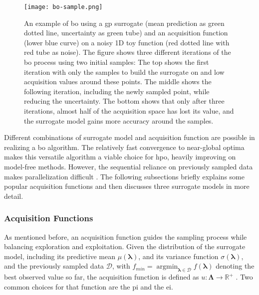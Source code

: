\begin{figure}[h]
	\centering
	\texttt{[image: bo-sample.png]}
	\caption[An example of \gls{bo} using a \gls{gp} surrogate]{An example of \gls{bo} using a \gls{gp} surrogate (mean prediction as green dotted line, uncertainty as green tube) and an acquisition function (lower blue curve) on a noisy 1D toy function (red dotted line with red tube as noise).
		The figure shows three different iterations of the \gls{bo} process using two initial samples: The top shows the first iteration with only the samples to build the surrogate on and low acquisition values around these points. The middle shows the following iteration, including the newly sampled point, while reducing the uncertainty. The bottom shows that only after three iterations, almost half of the acquisition space has lost its value, and the surrogate model gains more accuracy around the samples.}
	\label{fig:bo-sample}
\end{figure}

Different combinations of surrogate model and acquisition function are possible in realizing a \gls{bo} algorithm. The relatively fast convergence to near-global optima makes this versatile algorithm a viable choice for \gls{hpo}, heavily improving on model-free methods. However, the sequential reliance on previously sampled data makes parallelization difficult \cite{yang2020hyperparameter}.
The following subsections briefly explains some popular acquisition functions and then discusses three surrogate models in more detail.

\subsubsection{Acquisition Functions}
\label{chap:bo-acq}

As mentioned before, an acquisition function guides the sampling process while balancing exploration and exploitation. Given the distribution of the surrogate model, including its predictive mean $\mu(\mathbf{\lambda})$, and its variance function $\sigma(\mathbf{\lambda})$, and the previously sampled data $\mathcal{D}$, with $f_{min} = \operatorname*{argmin}_{\mathbf{\lambda}\in \mathcal{D}} f(\mathbf{\lambda})$ denoting the best observed value so far, the acquisition function is defined as $u: \mathbf{\Lambda} \to \mathbb{R}^+$ \cite{snoek2012practical}. Two common choices for that function are the \gls{pi} and the \gls{ei}.

